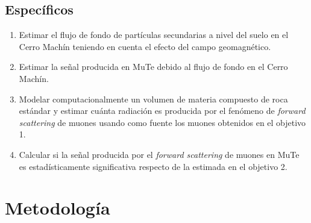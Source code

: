\documentclass[12pt]{report}
\begin{document}
\subsection*{Específicos}
\begin{enumerate}
    \item Estimar el flujo de fondo de partículas secundarias a nivel del suelo en el Cerro Machín teniendo en cuenta el efecto del campo geomagnético.
    \item Estimar la señal producida en MuTe debido al flujo de fondo en el Cerro Machín.
    \item Modelar computacionalmente un volumen de materia compuesto de roca estándar y estimar cuánta radiación es producida por el fenómeno de \textit{forward scattering} de muones usando como fuente los muones obtenidos en el objetivo 1.
    \item Calcular si la señal producida por el \textit{forward scattering} de muones en MuTe es estadísticamente significativa respecto de la estimada en el objetivo 2.
\end{enumerate}

\section*{Metodología}
\end{document}
